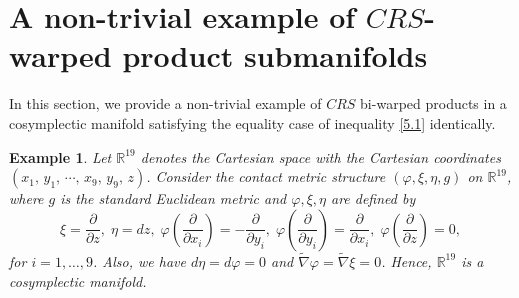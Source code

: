 \documentclass[reqno]{amsart}
\theoremstyle{plain}
\newtheorem{example}{Example}[section]
\theoremstyle{remark}
\numberwithin{equation}{section}
\begin{document}
\section{A non-trivial example of $CRS$-warped product submanifolds}\label{S7}

In this section, we provide a non-trivial example of $CRS$ bi-warped products in a cosymplectic manifold satisfying the equality case of inequality \eqref{5.1} identically.
\begin{example}
\rm{Let ${\mathbb{R}}^{19}$ denotes the Cartesian space with the Cartesian coordinates $(x_1,\,y_1,\,\cdots,\,x_9,\, y_9,\, z)$. Consider the contact metric structure $(\varphi,\xi,\eta,g)$  on ${\mathbb{R}}^{19}$, where $g$ is the standard Euclidean metric and $\varphi,\xi,\eta$ are defined by
\begin{equation}\label{7.1}
\xi=\frac{\partial}{\partial z},\; \eta=dz,\;  \varphi\left(\frac{\partial}{\partial x_i}\right)=-\frac{\partial}{\partial y_i},\;  \varphi\left(\frac{\partial}{\partial y_i}\right)=\frac{\partial}{\partial x_i},\; \varphi \left(\frac{\partial}{\partial z}\right)=0, 
\end{equation} 
for $i=1,\ldots,9$. Also,  we have $d\eta=d\varphi =0$ and $\widetilde \nabla \varphi=\widetilde \nabla \xi=0$. Hence, ${\mathbb{R}}^{19}$ is a cosymplectic manifold.


}
\end{example}
\end{document}
